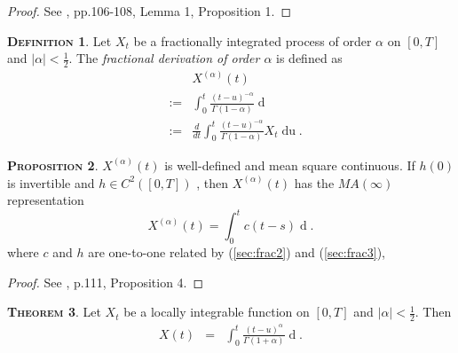 \documentclass[a4paper, twoside, 11pt]{article}
\theoremstyle{definition}
\newtheorem{definition}{\scshape Definition}[section]
\newtheorem{theorem}[definition]{\scshape Theorem}
\newtheorem{proposition}[definition]{\scshape Proposition}
\begin{document}
  \begin{proof}
	See \cite{core}, pp.106-108, Lemma 1, Proposition 1. 
  \end{proof}
  \begin{definition}
	Let  $X_t$ be a fractionally integrated process of order $\alpha$ on $[0, T]$ and $|\alpha| < \frac{1}{2}$. The \emph{fractional derivation of order $\alpha$} is defined as
	\begin{eqnarray}
	 && X^{(\alpha)}(t)\nonumber\\
	  &:=&  \int_0^t \frac{(t-u)^{-\alpha}}{\Gamma(1-\alpha)} \mathop{dX_{t}}\nonumber\\
	  &:=&  \frac{d}{dt}\int_0^t \frac{(t-u)^{-\alpha}}{\Gamma(1-\alpha)} X_{t} \mathop{du}. \nonumber
	  \label{sec:cc4}
	\end{eqnarray}
  \end{definition}
  \begin{proposition}
	$ X^{(\alpha)}(t)$ is well-defined and mean square continuous. If $h(0)$ is invertible and $h \in C^2([0, T])$ , then $X^{(\alpha)}(t)$ has the $MA(\infty)$ representation
	$$X^{(\alpha)}(t) = \int_0^t c(t-s) \mathop{dB_s}.$$
	where $c$ and $h$ are one-to-one related by (\ref{sec:frac2}) and (\ref{sec:frac3}),
  \end{proposition}
  \begin{proof}
	See  \cite{core}, p.111, Proposition 4.
	\end{proof}
	\begin{theorem}
	  Let  $X_t$ be a locally integrable function on $[0, T]$ and $|\alpha| < \frac{1}{2}$. Then
	  \begin{eqnarray}
	  X(t) &=& \int_0^t \frac{(t-u)^\alpha}{\Gamma(1+\alpha)}\mathop{dX^{(\alpha)}_u}.
	  \label{sec:imp}
	\end{eqnarray}
	\end{theorem}
\end{document}
